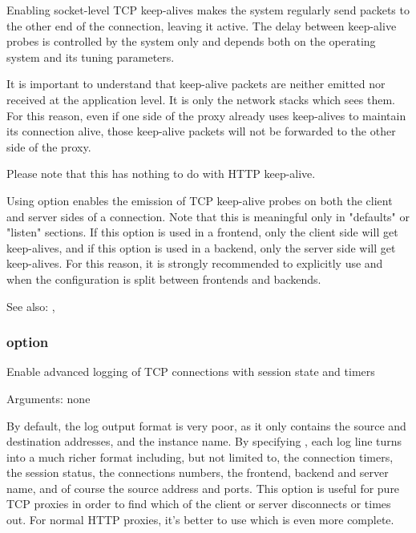{  Enabling socket-level TCP keep-alives makes the system regularly send packets
  to the other end of the connection, leaving it active. The delay between
  keep-alive probes is controlled by the system only and depends both on the
  operating system and its tuning parameters.

  It is important to understand that keep-alive packets are neither emitted nor
  received at the application level. It is only the network stacks which sees
  them. For this reason, even if one side of the proxy already uses keep-alives
  to maintain its connection alive, those keep-alive packets will not be
  forwarded to the other side of the proxy.

  Please note that this has nothing to do with HTTP keep-alive.

  Using option  enables the emission of TCP keep-alive probes on both
  the client and server sides of a connection. Note that this is meaningful
  only in "defaults" or "listen" sections. If this option is used in a
  frontend, only the client side will get keep-alives, and if this option is
  used in a backend, only the server side will get keep-alives. For this
  reason, it is strongly recommended to explicitly use  and
   when the configuration is split between frontends and
  backends.

  See also: , 

\subsubsection[tcplog]{option }


  Enable advanced logging of TCP connections with session state and timers


  Arguments: none

  By default, the log output format is very poor, as it only contains the
  source and destination addresses, and the instance name. By specifying
  , each log line turns into a much richer format including, but
  not limited to, the connection timers, the session status, the connections
  numbers, the frontend, backend and server name, and of course the source
  address and ports. This option is useful for pure TCP proxies in order to
  find which of the client or server disconnects or times out. For normal HTTP
  proxies, it's better to use  which is even more complete.

}
